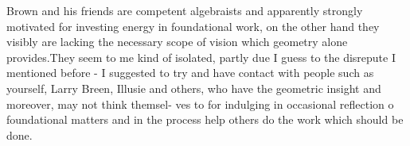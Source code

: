 \margin{\unsure{=}}
Brown and his friends are competent algebraists and apparently strongly
motivated for investing energy in foundational work,  on the other hand
they visibly are lacking the necessary scope of vision which geometry
alone provides.They seem to me kind of isolated,  partly due I guess to
the disrepute I mentioned before  -  I suggested to try and have contact
with people such as yourself, Larry Breen, Illusie and others,  who have
the geometric insight  and  moreover,  may not think themsel-%
ves to  for indulging in occasional reflection o foundational matters\hand{\unsure{,}}
and in the process help others do the work which should be done.


